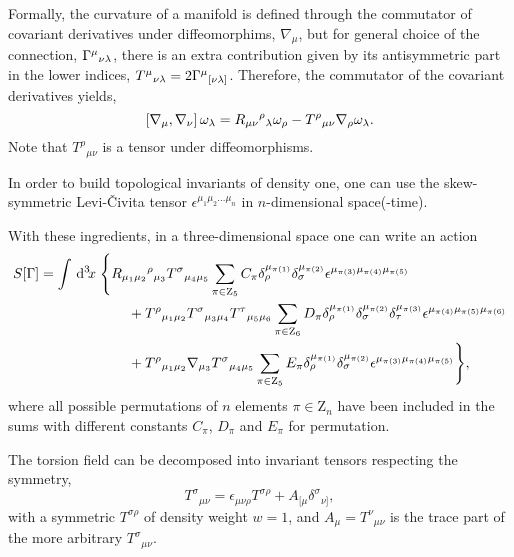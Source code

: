 \documentclass[twocolumn,
  showpacs,showkeys,prd,superscriptaddress]{revtex4-1}
\begin{document}
Formally, the curvature of a manifold is defined through the commutator of covariant derivatives under diffeomorphims, $\nabla_\mu$, but for general choice of the connection, $\Gamma^\mu{}_{\nu\lambda}$, there is an extra contribution given by its antisymmetric part in the lower indices, $T^\mu{}_{\nu\lambda}=2\Gamma^\mu{}_{[\nu\lambda]}$. Therefore, the commutator of the covariant derivatives yields,
\begin{equation}
  \left[\nabla_{{\mu}},\nabla_{{\nu}}\right]\omega_\lambda = R_{\mu\nu}{}^\rho{}_\lambda \omega _\rho - T^\rho{}_{\mu\nu}\nabla_{{\rho}}\omega_\lambda.\label{curvdef}
\end{equation}
Note that $T^\rho{}_{\mu\nu}$ is a  tensor under diffeomorphisms.

In order to build topological invariants of density one, one can use the skew-symmetric Levi-\v{C}ivita tensor $\epsilon^{\mu_1\mu_2\dots\mu_n}$ in $n$-dimensional space(-time).

\begin{widetext}
  With these ingredients, in a three-dimensional space one can write an action 
  \begin{equation}
    \label{accion3d}
    \begin{split}      
      S[\Gamma] =
      \int \,{\mathrm{d}}^{3}\!{x}\; & \Bigg\{R_{\mu_1\mu_2}{}^\rho{}_{\mu_3} T^\sigma{}_{\mu_4\mu_5}\sum_{\pi \in  \mathrm{Z}_5}C_\pi\delta_\rho^{\mu_{\pi(1)}} \delta_\sigma^{\mu_{\pi(2)}}\epsilon^{\mu_{\pi(3)}\mu_{\pi(4)}\mu_{\pi(5)}} \\ 
      & \qquad + T^\rho{}_{\mu_1\mu_2} T^\sigma{}_{\mu_3\mu_4}T^\tau{}_{\mu_5\mu_6} \sum_{\pi \in \mathrm{Z}_6}D_\pi\delta_\rho^{\mu_{\pi(1)}} \delta_\sigma^{\mu_{\pi(2)}}\delta_\tau^{\mu_{\pi(3)}}\epsilon^{\mu_{\pi(4)}\mu_{\pi(5)}\mu_{\pi(6)}} \\
      & \qquad  +T^\rho{}_{\mu_1\mu_2}\nabla_{\mu_3} T^\sigma{}_{\mu_4\mu_5}\sum_{\pi \in \mathrm Z_5}E_\pi\delta_\rho^{\mu_{\pi(1)}} \delta_\sigma^{\mu_{\pi(2)}}\epsilon^{\mu_{\pi(3)}\mu_{\pi(4)}\mu_{\pi(5)}} \Bigg\}, 
    \end{split}
  \end{equation}
  where all possible permutations of $n$ elements $\pi\in\mathrm{Z}_n$ have been included in the sums with  different constants $C_\pi$, $D_\pi$ and $E_\pi$ for  permutation. %
\end{widetext}

The torsion field can be decomposed into invariant tensors respecting the symmetry,
\begin{equation}
  T^\sigma{}_{\mu\nu}=\epsilon_{\mu\nu\rho} T^{\sigma\rho}+A_{[\mu}\delta^\sigma{}_{\nu]},
\end{equation}
with a symmetric $T^{\sigma\rho}$ of density weight  $w =1$, and \mbox{$A_\mu=T^\nu{}_{\mu\nu}$} is the trace part of the more arbitrary $T^\sigma{}_{\mu\nu}$.
\end{document}

